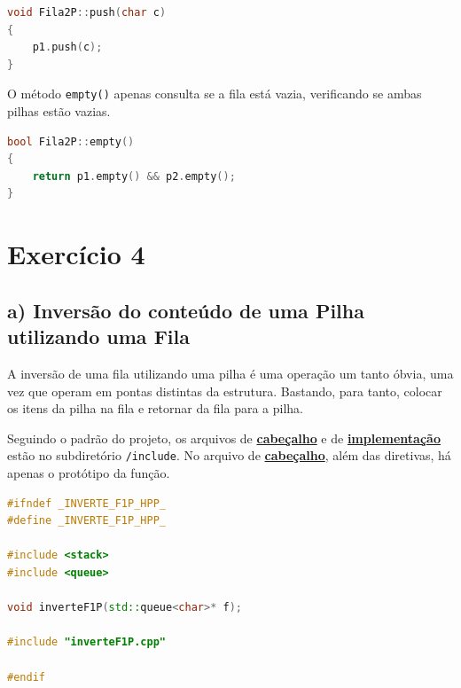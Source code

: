 \documentclass[
  brazilian,
  paper=a4,
  oneside  ,captions=tableheading
]{scrbook}
\newcommand{\passthrough}[1]{#1}
\begin{document}
\begin{lstlisting}[language={C++}]
void Fila2P::push(char c)
{
    p1.push(c);
}
\end{lstlisting}

O método \passthrough{\lstinline!empty()!} apenas consulta se a fila
está vazia, verificando se ambas pilhas estão vazias.

\begin{lstlisting}[language={C++}]
bool Fila2P::empty()
{
    return p1.empty() && p2.empty();
}
\end{lstlisting}

\hypertarget{exercuxedcio-4}{%
\chapter{Exercício 4}\label{exercuxedcio-4}}

\hypertarget{a-inversuxe3o-do-conteuxfado-de-uma-pilha-utilizando-uma-fila}{%
\section{a) Inversão do conteúdo de uma Pilha utilizando uma
Fila}\label{a-inversuxe3o-do-conteuxfado-de-uma-pilha-utilizando-uma-fila}}

A inversão de uma fila utilizando uma pilha é uma operação um tanto
óbvia, uma vez que operam em pontas distintas da estrutura. Bastando,
para tanto, colocar os itens da pilha na fila e retornar da fila para a
pilha.

Seguindo o padrão do projeto, os arquivos de
\href{https://github.com/ecostadelle/lista_pilhas_filas/blob/main/include/inverteF1P.hpp}{\textbf{cabeçalho}}
e de
\href{https://github.com/ecostadelle/lista_pilhas_filas/blob/main/include/inverteF1P.cpp}{\textbf{implementação}}
estão no subdiretório \passthrough{\lstinline!/include!}. No arquivo de
\href{https://github.com/ecostadelle/lista_pilhas_filas/blob/main/include/inverteF1P.hpp}{\textbf{cabeçalho}},
além das diretivas, há apenas o protótipo da função.

\begin{lstlisting}[language={C++}]
#ifndef _INVERTE_F1P_HPP_
#define _INVERTE_F1P_HPP_

#include <stack>
#include <queue>

void inverteF1P(std::queue<char>* f);

#include "inverteF1P.cpp"   

#endif
\end{lstlisting}
\end{document}
